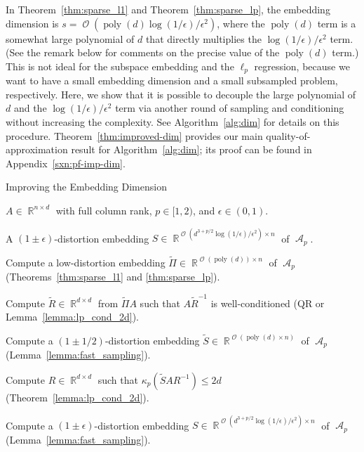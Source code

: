 \documentclass[11pt]{article}
\DeclareMathOperator{\poly}{poly}
\DeclareMathOperator{\bigO}{\mathcal{O}}
\DeclareMathOperator{\A}{\mathcal{A}}
\DeclareMathOperator{\R}{\mathbb{R}}
\begin{document}
In Theorem~\ref{thm:sparse_l1} and Theorem~\ref{thm:sparse_lp}, the embedding
dimension is $s = \bigO(\poly(d) \log(1/\epsilon)/\epsilon^2)$, where the
$\poly(d)$ term is a somewhat large polynomial of $d$ that directly multiplies
the $\log(1/\epsilon)/\epsilon^2$ term.  
(See the remark below for comments on the precise value of the $\poly(d)$ term.)
This is not ideal for the subspace embedding and the $\ell_p$ regression,
because we want to have a small embedding dimension and a small subsampled
problem, respectively.
Here, we show that it is possible to decouple the large polynomial of $d$ and
the $\log(1/\epsilon)/\epsilon^2$ term via another round of sampling and
conditioning without increasing the complexity.
See Algorithm~\ref{alg:dim} for details on this procedure.
Theorem~\ref{thm:improved-dim} provides our main quality-of-approximation result
for Algorithm~\ref{alg:dim}; its proof can be found in
Appendix~\ref{sxn:pf-imp-dim}.

\begin{algorithm}
  \caption{Improving the Embedding Dimension}
  \label{alg:dim}
  \begin{algorithmic}[1]
    \Require $A \in \R^{n \times d}$ with full column rank, $p \in [1, 2)$, and
    $\epsilon \in (0, 1)$.

    \Ensure A $(1\pm\epsilon)$-distortion embedding $S \in
    \R^{\bigO(d^{3 + p/2} \log(1/\epsilon)/\epsilon^2) \times n}$ of $\A_p$.

    \State Compute a low-distortion embedding $\tilde{\Pi} \in
    \R^{\bigO(\poly(d)) \times n}$ of $\A_p$ (Theorems~\ref{thm:sparse_l1} and
    \ref{thm:sparse_lp}).
    
    \State Compute $\tilde{R} \in \R^{d \times d}$ from $\tilde{\Pi} A$ such
    that $A \tilde{R}^{-1}$ is well-conditioned (QR or
    Lemma~\ref{lemma:lp_cond_2d}).

    \State Compute a $(1 \pm 1/2)$-distortion embedding $\tilde{S} \in
    \R^{\bigO(\poly(d) \times n)}$ of $\A_p$ (Lemma~\ref{lemma:fast_sampling}).
    
    \State Compute $R \in \R^{d \times d}$ such that $\kappa_p(\tilde{S} A
    R^{-1}) \leq 2 d$ (Theorem~\ref{lemma:lp_cond_2d}).

    \State Compute a $(1 \pm \epsilon)$-distortion embedding $S \in
    \R^{\bigO(d^{3+p/2} \log(1/\epsilon) / \epsilon^2 )\times n}$ of $\A_p$
    (Lemma~\ref{lemma:fast_sampling}).
  \end{algorithmic}
\end{algorithm}
\end{document}
